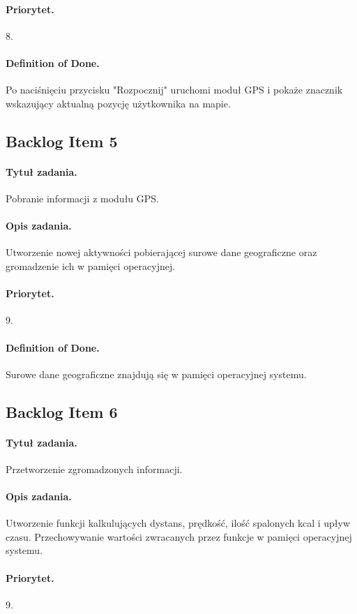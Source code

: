 \documentclass[a4paper]{article}
\begin{document}
\paragraph{Priorytet.} 8.
\paragraph{Definition of Done.} Po naciśnięciu przycisku "Rozpocznij" uruchomi moduł GPS i pokaże znacznik wskazujący aktualną pozycję użytkownika na mapie.

\subsection{Backlog Item 5}
\paragraph{Tytuł zadania.} Pobranie informacji z modułu GPS.
\paragraph{Opis zadania.} Utworzenie nowej aktywności pobierającej surowe dane geograficzne oraz gromadzenie ich w pamięci operacyjnej.
\paragraph{Priorytet.} 9.
\paragraph{Definition of Done.} Surowe dane geograficzne znajdują się w pamięci operacyjnej systemu.

\subsection{Backlog Item 6}
\paragraph{Tytuł zadania.} Przetworzenie zgromadzonych informacji.
\paragraph{Opis zadania.} Utworzenie funkcji kalkulujących dystans, prędkość, ilość spalonych kcal i upływ czasu. Przechowywanie wartości zwracanych przez funkcje w pamięci operacyjnej systemu. 
\paragraph{Priorytet.} 9.
\end{document}
